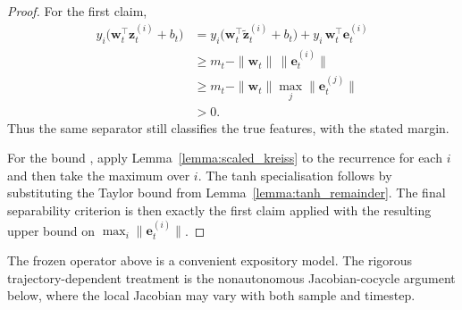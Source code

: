 \documentclass{article}
\theoremstyle{remark}
\newcommand{\bz}{\mathbf{z}}
\begin{document}
\begin{proof}
For the first claim,
\begin{align*}
  y_i\bigl(\mathbf{w}_t^\top \bz_t^{(i)} + b_t\bigr)
  &= y_i\bigl(\mathbf{w}_t^\top \tilde{\bz}_t^{(i)} + b_t\bigr)
   + y_i\,\mathbf{w}_t^\top \mathbf{e}_t^{(i)} \\
  &\geq m_t - \|\mathbf{w}_t\|\,\|\mathbf{e}_t^{(i)}\| \\
  &\geq m_t - \|\mathbf{w}_t\| \max_j \|\mathbf{e}_t^{(j)}\| \\
  &> 0.
\end{align*}
Thus the same separator still classifies the true features, with the stated
margin.

For the bound , apply
Lemma~\ref{lemma:scaled_kreiss} to the recurrence for each $i$ and then take
the maximum over $i$. The tanh specialisation follows by substituting the
Taylor bound from Lemma~\ref{lemma:tanh_remainder}. The final separability
criterion is then exactly the first claim applied with the resulting upper
bound on $\max_i\|\mathbf{e}_t^{(i)}\|$.
\end{proof}

The frozen operator above is a convenient expository model. The rigorous
trajectory-dependent treatment is the nonautonomous Jacobian-cocycle argument
below, where the local Jacobian may vary with both sample and timestep.
\end{document}
